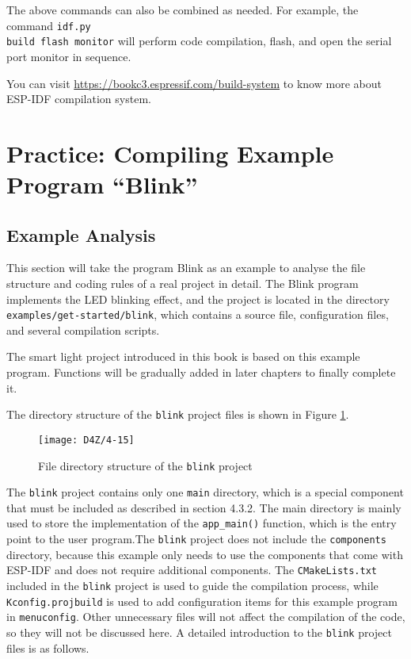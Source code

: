 \documentclass[a4paper,12pt]{book}
\begin{document}
The above commands can also be combined as needed. For example, the command \verb|idf.py |\\ \verb|build flash monitor| will perform code compilation, flash, and open the serial port monitor in sequence.

You can visit \url{https://bookc3.espressif.com/build-system} to know more about ESP-IDF compilation system.

\section{Practice: Compiling Example Program “Blink”}
\subsection{Example Analysis}
This section will take the program Blink as an example to analyse the file structure and coding rules of a real project in detail. The Blink program implements the LED blinking effect, and the project is located in the directory \verb|examples/get-started/blink|, which contains a source file, configuration files, and several compilation scripts.

The smart light project introduced in this book is based on this example program. Functions will be gradually added in later chapters to finally complete it.


The directory structure of the \verb|blink| project files is shown in Figure \ref{File directory structure of the blink project}.

\begin{figure}[h!]
    \centering
    \texttt{[image: D4Z/4-15]}
    \caption{File directory structure of the \texttt{blink} project}
    \label{File directory structure of the blink project}
\end{figure}

The \verb|blink| project contains only one \verb|main| directory, which is a special component that must be included as described in section 4.3.2. The main directory is mainly used to store the implementation of the \verb|app_main()| function, which is the entry point to the user program.The \verb|blink| project does not include the \verb|components| directory, because this example only needs to use the components that come with ESP-IDF and does not require additional components. The \verb|CMakeLists.txt| included in the \verb|blink| project is used to guide the compilation process, while \verb|Kconfig.projbuild| is used to add configuration items for this example program in \verb|menuconfig|. Other unnecessary files will not affect the compilation of the code, so they will not be discussed here. A detailed introduction to the \verb|blink| project files is as follows.
\end{document}
